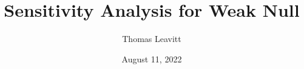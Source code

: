 \documentclass[table, xcolor = {dvipsnames}, 9pt]{beamer}
\title[]{Sensitivity Analysis for Weak Null} %
\author{Thomas Leavitt} %
\institute[] %
{ %
\medskip
\textit{} %
}
\date{August 11, 2022} %
\theoremstyle{plain}
\begin{document}
\begin{frame}
\titlepage %
\end{frame}


\end{document}
